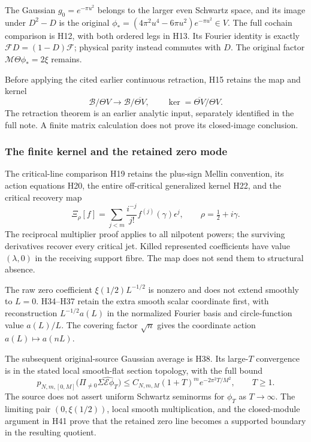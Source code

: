 The Gaussian $g_0=e^{-\pi u^2}$ belongs to the larger even Schwartz
space, and its image under $D^2-D$ is the original
$\phi_*=(4\pi^2u^4-6\pi u^2)e^{-\pi u^2}\in V$.
The full cochain comparison is H12, with both ordered legs in H13.
Its Fourier identity is exactly
$\mathcal FD=(1-D)\mathcal F$; physical parity instead commutes
with $D$. The original factor $\mathcal M\Theta\phi_*=2\xi$ remains.

Before applying the cited earlier continuous retraction, H15 retains
the map and kernel
\[
 \mathscr B/\Theta V\longrightarrow
 \mathscr B/\overline{\Theta V},\qquad
 \ker=\overline{\Theta V}/\Theta V.
\]
The retraction theorem is an earlier analytic input, separately
identified in the full note. A finite matrix calculation does not
prove its closed-image conclusion.

\subsubsection{The finite kernel and the retained zero mode}

The critical-line comparison H19 retains the plus-sign Mellin
convention, its action equations H20, the entire off-critical
generalized kernel H22, and the critical recovery map
\[
 \Xi_\rho[f]=\sum_{j<m}\frac{i^{-j}}{j!}
 f^{(j)}(\gamma)\epsilon^j,
 \qquad\rho=\tfrac12+i\gamma.
\]
The reciprocal multiplier proof applies to all nilpotent powers;
the surviving derivatives recover every critical jet.
Killed represented coefficients have value $(\lambda,0)$ in
the receiving support fibre. The map does not send them to
structural absence.

The raw zero coefficient $\xi(1/2)L^{-1/2}$ is nonzero and does
not extend smoothly to $L=0$. H34--H37 retain the extra smooth
scalar coordinate first, with reconstruction $L^{-1/2}a(L)$ in
the normalized Fourier basis and circle-function value $a(L)/L$.
The covering factor $\sqrt n$ gives the coordinate action
$a(L)\mapsto a(nL)$.

The subsequent original-source Gaussian average is H38. Its
large-$T$ convergence is in the stated local smooth-flat section
topology, with the full bound
\[
 p_{N,m,[0,M]}
 \bigl(\Pi_{\ne0}\widehat{\Sigma\mathcal E\phi_T}\bigr)
 \le C_{N,m,M}(1+T)^m e^{-2\pi^2T/M^2},\qquad T\ge1.
\]
The source does not assert uniform Schwartz seminorms for
$\phi_T$ as $T\to\infty$. The limiting pair
$(0,\xi(1/2))$, local smooth multiplication, and the closed-module
argument in H41 prove that the retained zero line becomes a
supported boundary in the resulting quotient.

